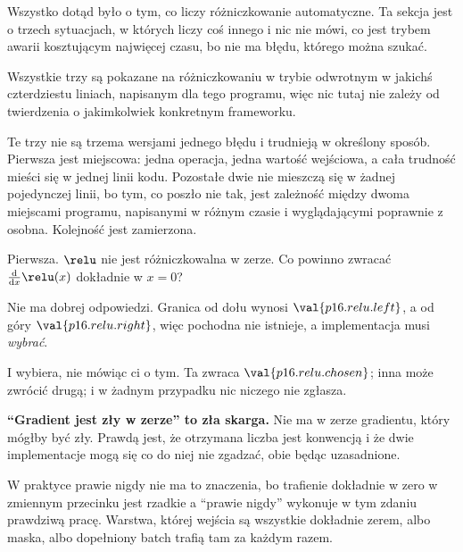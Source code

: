 \begin{fr}
Wszystko dotąd było o tym, co liczy różniczkowanie automatyczne. Ta sekcja jest
o trzech sytuacjach, w których liczy coś innego i nic nie mówi, co jest trybem
awarii kosztującym najwięcej czasu, bo nie ma błędu, którego można szukać.

Wszystkie trzy są pokazane na różniczkowaniu w trybie odwrotnym w jakichś
czterdziestu liniach, napisanym dla tego programu, więc nic tutaj nie zależy od
twierdzenia o jakimkolwiek konkretnym frameworku.

Te trzy nie są trzema wersjami jednego błędu i trudnieją w określony sposób.
Pierwsza jest miejscowa: jedna operacja, jedna wartość wejściowa, a cała
trudność mieści się w jednej linii kodu. Pozostałe dwie nie mieszczą się
w żadnej pojedynczej linii, bo tym, co poszło nie tak, jest zależność między
dwoma miejscami programu, napisanymi w różnym czasie i wyglądającymi poprawnie
z osobna. Kolejność jest zamierzona.

Pierwsza. $\relu$ nie jest różniczkowalna w zerze. Co powinno zwracać
$\frac{\mathrm{d}}{\mathrm{d}x}\relu(x)$ dokładnie w $x = 0$?
\dotline
\nextframe
\end{fr}

\begin{fr}
\begin{ansblock}
Nie ma dobrej odpowiedzi. Granica od dołu wynosi $\val{p16.relu.left}$, a od
góry $\val{p16.relu.right}$, więc pochodna nie istnieje, a implementacja musi
\emph{wybrać}.
\end{ansblock}

I wybiera, nie mówiąc ci o tym. Ta zwraca $\val{p16.relu.chosen}$; inna może
zwrócić drugą; i w żadnym przypadku nic niczego nie zgłasza.


\begin{trapbox}
\textbf{\enquote{Gradient jest zły w zerze} to zła skarga.} Nie ma w zerze
gradientu, który mógłby być zły. Prawdą jest, że otrzymana liczba jest
konwencją i że dwie implementacje mogą się co do niej nie zgadzać, obie będąc
uzasadnione.

W praktyce prawie nigdy nie ma to znaczenia, bo trafienie dokładnie w zero w
zmiennym przecinku jest rzadkie \dash{} a \enquote{prawie nigdy} wykonuje w tym
zdaniu prawdziwą pracę. Warstwa, której wejścia są wszystkie dokładnie zerem,
albo maska, albo dopełniony batch trafią tam za każdym razem.
\end{trapbox}
\end{fr}

